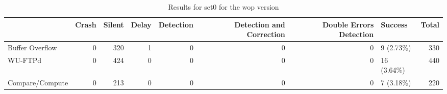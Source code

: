 \begin{table}[t]
	\centering
	\caption{Results for set0 for the wop version}
	\label{table:end_sim_by_status_wop_1_set0}
	\begin{tabular}{lrrrrrrlr}
		\toprule
		                & Crash & Silent & Delay & Detection & Detection and Correction & Double Errors Detection & Success     & Total \\
		\midrule
		Buffer Overflow & 0     & 320    & 1     & 0         & 0                        & 0                       & 9 (2.73\%)  & 330   \\
		WU-FTPd         & 0     & 424    & 0     & 0         & 0                        & 0                       & 16 (3.64\%) & 440   \\
		Compare/Compute & 0     & 213    & 0     & 0         & 0                        & 0                       & 7 (3.18\%)  & 220   \\
		\bottomrule
	\end{tabular}
\end{table}
